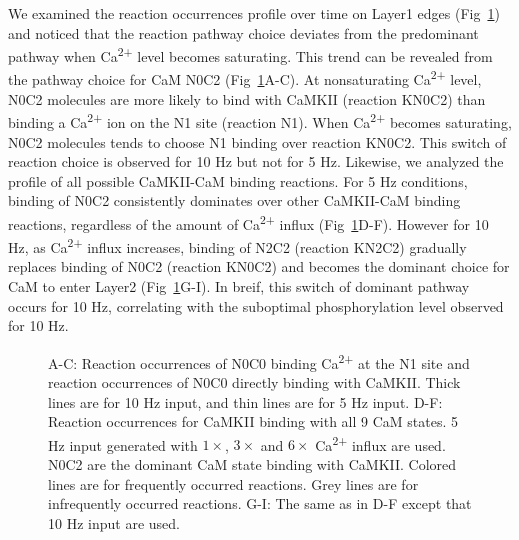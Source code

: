 \documentclass[10pt,letterpaper]{article}
\begin{document}
We examined the reaction occurrences profile over time on Layer1 edges (Fig~\ref{fig6}) and noticed that the reaction pathway choice deviates from the predominant pathway when Ca\textsuperscript{2+} level becomes saturating. This trend can be revealed from the pathway choice for CaM N0C2 (Fig~\ref{fig6}A-C). At nonsaturating Ca\textsuperscript{2+} level, N0C2 molecules are more likely to bind with CaMKII (reaction KN0C2) than binding a Ca\textsuperscript{2+} ion on the N1 site (reaction N1). When Ca\textsuperscript{2+} becomes saturating, N0C2 molecules tends to choose N1 binding over reaction KN0C2. This switch of reaction choice is observed for 10 Hz but not for 5 Hz. Likewise, we analyzed the profile of all possible CaMKII-CaM binding reactions. For 5 Hz conditions, binding of N0C2 consistently dominates over other CaMKII-CaM binding reactions, regardless of the amount of Ca\textsuperscript{2+} influx (Fig~\ref{fig6}D-F). However for 10 Hz, as Ca\textsuperscript{2+} influx increases, binding of N2C2 (reaction KN2C2) gradually replaces binding of N0C2 (reaction KN0C2) and becomes the dominant choice for CaM to enter Layer2 (Fig~\ref{fig6}G-I). In breif, this switch of dominant pathway occurs for 10 Hz, correlating with the suboptimal phosphorylation level observed for 10 Hz.

\begin{figure}[!h]
	\caption{{\bf}
	A-C: Reaction occurrences of N0C0 binding Ca\textsuperscript{2+} at the N1 site and reaction occurrences of N0C0 directly binding with CaMKII. Thick lines are for 10 Hz input, and thin lines are for 5 Hz input. D-F: Reaction occurrences for CaMKII binding with all 9 CaM states. 5 Hz input generated with $1\times$, $3\times$ and $6\times$ Ca\textsuperscript{2+} influx are used. N0C2 are the dominant CaM state binding with CaMKII. Colored lines are for frequently occurred reactions. Grey lines are for infrequently occurred reactions. G-I: The same as in D-F except that 10 Hz input are used. 
	}
\label{fig6}
\end{figure}
\end{document}
